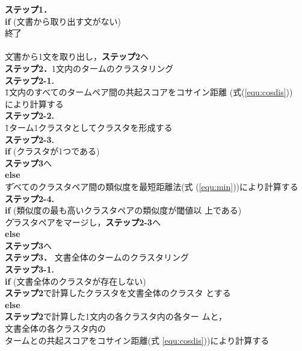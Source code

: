 \begin{tabbing}
{\bf ステップ1．}\\
\quad \= {\bf if} (文書から取り出す文がない)\\
	\>\quad \= 終了\\
	\\
	\>\quad \= 文書から1文を取り出し，{\bf ステップ2}へ\\
{\bf ステップ2．}1文内のタームのクラスタリング\\
\quad \= {\bf ステップ2-1.}\\
	\>\quad \=  1文内のすべてのタームペア間の共起スコアをコサイン距離
(式(\ref{equ:cosdis}))\\
	\>\>により計算する\\
\quad \= {\bf ステップ2-2.}\\
	\>\quad \= 1ターム1クラスタとしてクラスタを形成する\\
\quad \= {\bf ステップ2-3.}\\
	\>\quad \= {\bf if} (クラスタが1つである)\\
	\>\>\quad \= {\bf ステップ3}へ\\
	\>\> {\bf else}\\
	\>\>\quad \= すべてのクラスタペア間の類似度を最短距離法(式
			(\ref{equ:min}))により計算する\\
\quad \= {\bf ステップ2-4.}\\
	\>\quad \= {\bf if} (類似度の最も高いクラスタペアの類似度が閾値以
	上である)\\
	\>\>\quad \= クラスタペアをマージし，{\bf ステップ2-3}へ\\
	\>\> {\bf else}\\
	\>\>\quad \= {\bf ステップ3}へ\\

{\bf ステップ3．} 文書全体のタームのクラスタリング\\
\quad \= {\bf ステップ3-1.}\\
	\>\quad \= {\bf if} (文書全体のクラスタが存在しない)\\
	\>\>\quad \= {\bf ステップ2}で計算したクラスタを文書全体のクラスタ
	とする\\
	\>\quad \= {\bf else}\\
	\>\>\quad \= {\bf ステップ2}で計算した1文内の各クラスタ内の各ター
	ムと，\\
	\>\>\>文書全体の各クラスタ内の\\
	\>\>\>タームとの共起スコアをコサイン距離(式
	\ref{equ:cosdis}))により計算する\\


\end{tabbing}
